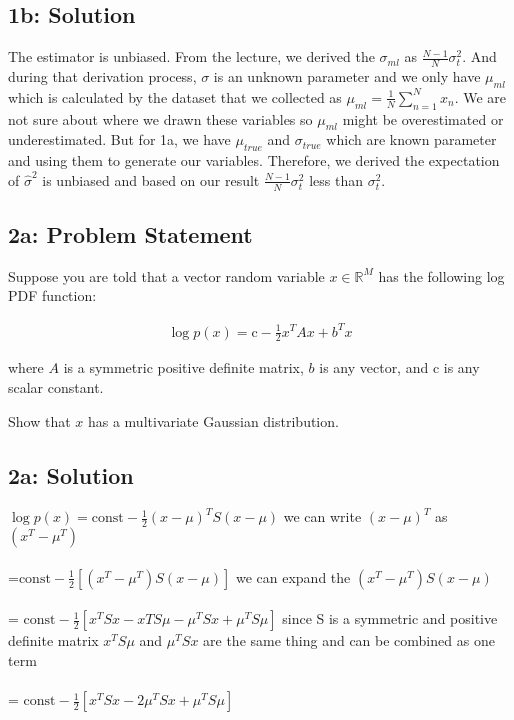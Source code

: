 \documentclass[10pt]{article}
\newcommand{\officialdirections}[1]{{\color{purple} #1}}
\begin{document}
\subsection{1b: Solution}
The estimator is unbiased. From the lecture, we derived the $\sigma_{ml}$ as $\frac{N-1}{N}\sigma_t^2$. And during that derivation process, $\sigma$ is an unknown parameter and we only have $\mu_{ml}$ which is calculated by the dataset that we collected as $\mu_{ml} = \frac{1}{N}\sum_{n=1}^Nx_n$. We are not sure about where we drawn these variables so $\mu_{ml}$ might be overestimated or underestimated. But for 1a, we have $\mu_{true}$ and $\sigma_{true}$ which are known parameter and using them to generate our variables. Therefore, we derived the expectation of $\hat{\sigma}^2$ is unbiased and based on our result $\frac{N-1}{N}\sigma_t^2 $ less than $ \sigma_t^2$.


\officialdirections{
\subsection*{2a: Problem Statement}
Suppose you are told that a vector random variable $x \in \mathbb{R}^M$ has the following log PDF function:

\begin{align}
\log p(x) = \text{c} - \frac{1}{2} x^T A x + b^T x
\end{align}

where $A$ is a symmetric positive definite matrix, $b$ is any vector, and $\text{c}$ is any scalar constant.

Show that $x$ has a multivariate Gaussian distribution.
}

\subsection{2a: Solution}
$\log p(x) = \text{const} - \frac{1}{2}(x-\mu)^TS(x-\mu)$ we can write $(x-\mu)^T$ as $(x^T-\mu^T)$
\\
\\
=$\text{const} - \frac{1}{2}[(x^T-\mu^T)S(x-\mu)]$ we can expand the $(x^T-\mu^T)S(x-\mu)$
\\
\\
= $\text{const}-\frac{1}{2}[x^TSx-xTS\mu-\mu^TSx + \mu^TS\mu]$ since S is a symmetric and positive definite matrix $x^TS\mu$ and $\mu^TSx$ are the same thing and can be combined as one term
\\
\\
= $\text{const}-\frac{1}{2}[x^TSx - 2\mu^TSx + \mu^TS\mu]$
\end{document}
